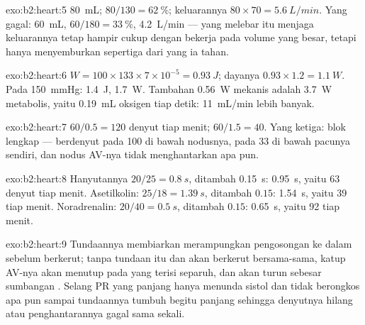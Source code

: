 \begin{solution}{exo:b2:heart:5}
 \qty{80}{mL};  $80/130 = \qty{62}{\%}$;
keluarannya $80\times 70 = \qty{5.6}{L/min}$. Yang gagal: \qty{60}{mL},
$60/180 = \qty{33}{\%}$, \qty{4.2}{L/min} ---  yang melebar itu
menjaga keluarannya tetap hampir cukup dengan bekerja pada volume yang
besar, tetapi hanya menyemburkan sepertiga dari yang ia tahan.
\end{solution}

\begin{solution}{exo:b2:heart:6}
$W = 100\times 133\times 7\times 10^{-5} = \qty{0.93}{J}$; dayanya
$0.93\times 1.2 = \qty{1.1}{W}$. Pada \qty{150}{mmHg}: \qty{1.4}{J},
\qty{1.7}{W}. Tambahan \qty{0.56}{W} mekanis adalah \qty{3.7}{W}
metabolis, yaitu \qty{0.19}{mL} oksigen tiap detik: \qty{11}{mL/min} lebih banyak.
\end{solution}

\begin{solution}{exo:b2:heart:7}
$60/0.5 = 120$ denyut tiap menit; $60/1.5 = 40$. Yang ketiga: blok
 lengkap ---  berdenyut pada 100 di bawah nodusnya,
 pada 33 di bawah pacunya sendiri, dan nodus AV-nya tidak
menghantarkan apa pun.
\end{solution}

\begin{solution}{exo:b2:heart:8}
Hanyutannya $20/25 = \qty{0.8}{s}$, ditambah \qty{0.15}{s}:
\qty{0.95}{s}, yaitu 63 denyut tiap menit. Asetilkolin: $25/18 = \qty{1.39}{s}$, ditambah $0.15$:
\qty{1.54}{s}, yaitu 39 tiap menit. Noradrenalin: $20/40 = \qty{0.5}{s}$,
ditambah $0.15$: \qty{0.65}{s}, yaitu 92 tiap menit.
\end{solution}

\begin{solution}{exo:b2:heart:9}
Tundaannya membiarkan  merampungkan pengosongan ke dalam
 sebelum  berkerut; tanpa tundaan itu  dan
 akan berkerut bersama-sama, katup AV-nya akan menutup pada
 yang terisi separuh, dan  akan turun sebesar
sumbangan . Selang PR yang panjang hanya menunda sistol
 dan tidak berongkos apa pun sampai tundaannya tumbuh begitu
panjang sehingga denyutnya hilang atau penghantarannya gagal sama
sekali.
\end{solution}

